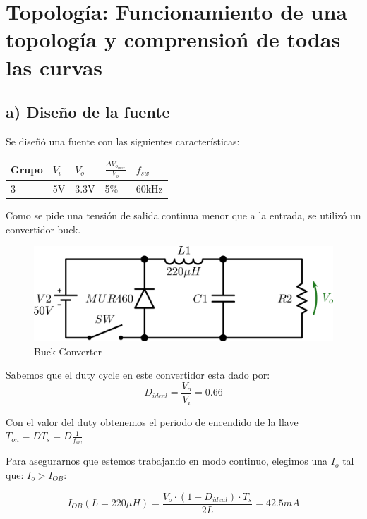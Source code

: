 \documentclass[e4_tp1_main.tex]{subfiles}
\begin{document}
\section{Topolog\'ia: Funcionamiento de una topolog\'ia y comprensio\'n de todas las curvas}

\subsection*{a) Diseño de la fuente} 

Se diseñ\'o una fuente con las siguientes caracter\'isticas:

\begin{table}[H]
\centering
\begin{tabular}{|l|l|l|l|l|}
\hline
\multicolumn{1}{|c|}{Grupo}  & $V_{i}$ & $V_{o}$  & $\frac{\Delta V_{o_{max}}}{V_o}$ & $f_{sw}$ \\ \hline
3     						& 5V     & 3.3V  & 5\%   & 60kHz  \\ \hline
\end{tabular}
\label{tabla:datos de la fuente}
\end{table} 



Como se pide una tensi\'on de salida continua menor que a la entrada, se utiliz\'o un convertidor buck. 


\begin{figure}[H]
  \centering
    \includegraphics[scale = 0.4]{Imagenes/punto2/Circuito2.png}
  \caption{Buck Converter}
  \label{Circuito}
\end{figure}




Sabemos que el duty cycle en este convertidor esta dado por: 
$$D_{ideal}=\frac{V_o}{V_i}=0.66$$

Con el valor del duty obtenemos el periodo de encendido de la llave $T_{on}=D T_s=D \frac{1}{f_{sw}}$


Para asegurarnos que estemos trabajando en modo continuo, elegimos una $I_{o}$ tal que: $I_{o}>I_{OB}$:

\[
I_{OB}(L=220\mu H) = \frac{V_o \cdot (1-D_{ideal}) \cdot T_s}{2L} = 42.5mA
\]
\end{document}
